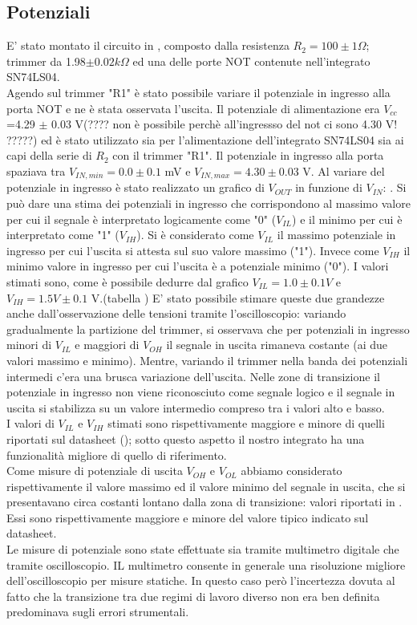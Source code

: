 \subsection{Potenziali}
E' stato montato il circuito in , composto dalla resistenza $R_{2}=100 \pm 1 \Omega$; trimmer da 1.98$\pm 0.02 k\Omega$ ed una delle porte NOT contenute nell'integrato SN74LS04.\\
 Agendo sul trimmer "R1" è stato possibile variare il potenziale in ingresso alla porta NOT e ne è stata osservata l'uscita. Il potenziale di alimentazione era $V_{cc}$=4.29 $\pm$ 0.03 V(???? non è possibile perchè all'ingressso del not ci sono 4.30 V! ?????) ed è stato utilizzato sia per l'alimentazione dell'integrato SN74LS04 sia ai capi della serie di $R_2$ con il trimmer "R1". Il potenziale in ingresso alla porta spaziava tra $V_{IN,min}=0.0 \pm 0.1$ mV e $V_{IN,max}=4.30 \pm 0.03$ V. Al variare del potenziale in ingresso è stato realizzato un grafico di $V_{OUT}$ in funzione di $V_{IN}$: . Si può dare una stima dei potenziali in ingresso che corrispondono al massimo valore per cui il segnale è interpretato logicamente come "0" ($V_{IL}$) e il minimo per cui è interpretato come "1" ($V_{IH}$). Si è considerato come $V_{IL}$ il massimo potenziale in ingresso per cui l'uscita si attesta sul suo valore massimo ("1"). Invece come $V_{IH}$ il minimo valore in ingresso per cui l'uscita è a potenziale minimo ("0"). I valori stimati sono, come è possibile dedurre dal grafico   $V_{IL}=1.0 \pm 0.1 V$ e $V_{IH}=1.5V \pm 0.1$ V.(tabella )
 E' stato possibile stimare queste due grandezze anche dall'osservazione delle tensioni tramite l'oscilloscopio: variando gradualmente la partizione del trimmer, si osservava che per potenziali in ingresso minori di $V_{IL}$ e maggiori di $V_{OH}$ il segnale in uscita rimaneva costante (ai due valori massimo e minimo). Mentre, variando il trimmer nella banda dei potenziali intermedi c'era una brusca variazione dell'uscita. Nelle zone di transizione il potenziale in ingresso  non viene riconosciuto come segnale logico e il segnale in uscita si stabilizza su un valore intermedio compreso tra i valori alto e basso.\\ 
 I valori di  $V_{IL}$ e $V_{IH}$ stimati sono rispettivamente maggiore e minore di quelli riportati sul datasheet (); sotto questo aspetto il nostro integrato ha una funzionalità migliore di quello di riferimento. \\
Come misure di potenziale di uscita $V_{OH}$ e $V_{OL}$ abbiamo considerato rispettivamente il valore massimo ed il valore minimo del segnale in uscita, che si presentavano circa costanti lontano dalla zona di transizione: valori riportati in .  Essi sono rispettivamente maggiore e minore del valore tipico indicato sul datasheet.\\
Le misure di potenziale sono state effettuate sia tramite multimetro digitale che tramite oscilloscopio. IL multimetro consente in generale una risoluzione migliore dell'oscilloscopio per misure statiche. In questo caso però l'incertezza dovuta al fatto che la transizione tra due regimi di lavoro diverso non era ben definita predominava sugli errori strumentali.
